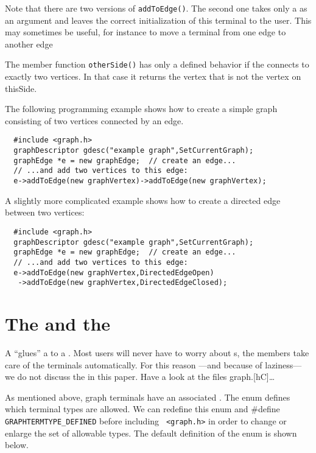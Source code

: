 Note that there are two versions of {\tt addToEdge()}. The second one takes
only a  as an argument and leaves the correct
initialization of this terminal to the user. This may sometimes be useful, for
instance to move a terminal from one edge to another edge

The member function {\tt otherSide()} has only a defined behavior if the
 connects to exactly two vertices. In that case it returns the
vertex that is not the vertex on thisSide.

The following programming example shows how to create a simple graph consisting
of two vertices connected by an edge.

{\footnotesize \begin{verbatim}
  #include <graph.h>
  graphDescriptor gdesc("example graph",SetCurrentGraph);
  graphEdge *e = new graphEdge;  // create an edge...
  // ...and add two vertices to this edge:
  e->addToEdge(new graphVertex)->addToEdge(new graphVertex);
\end{verbatim}}

A slightly more complicated example shows how to create a directed edge between
two vertices:

{\footnotesize \begin{verbatim}
  #include <graph.h>
  graphDescriptor gdesc("example graph",SetCurrentGraph);
  graphEdge *e = new graphEdge;  // create an edge...
  // ...and add two vertices to this edge:
  e->addToEdge(new graphVertex,DirectedEdgeOpen)
   ->addToEdge(new graphVertex,DirectedEdgeClosed);
\end{verbatim}}

\section{The  and the }
\label{s-terminal}
A  ``glues'' a  to a .
Most users will never have to worry about s, the
 members take care of the terminals automatically. For this
reason ---and because of laziness--- we do not discuss the  in
this paper.  Have a look at the files graph.[hC]\ldots

As mentioned above, graph terminals have an associated .
The enum  defines which terminal types are allowed. We can
redefine this enum and \#define {\tt GRAPHTERMTYPE\_DEFINED} before including {\tt
<graph.h>} in order to change or enlarge the set of allowable types. The
default definition of the enum is shown below.

